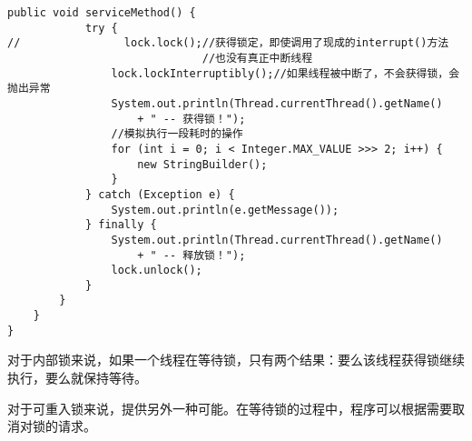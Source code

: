 \documentclass[a4paper]{report}
\begin{document}
\begin{Verbatim}[frame=single,numbersep=5pt,xleftmargin=1.5em,xrightmargin=1.5em]
        public void serviceMethod() {
            try {
//                lock.lock();//获得锁定，即使调用了现成的interrupt()方法
                              //也没有真正中断线程
                lock.lockInterruptibly();//如果线程被中断了，不会获得锁，会抛出异常
                System.out.println(Thread.currentThread().getName() 
                    + " -- 获得锁！");
                //模拟执行一段耗时的操作
                for (int i = 0; i < Integer.MAX_VALUE >>> 2; i++) {
                    new StringBuilder();
                }
            } catch (Exception e) {
                System.out.println(e.getMessage());
            } finally {
                System.out.println(Thread.currentThread().getName() 
                    + " -- 释放锁！");
                lock.unlock();
            }
        }
    }
}
\end{Verbatim}

对于内部锁来说，如果一个线程在等待锁，只有两个结果：要么该线程获得锁继续执行，要么就保持等待。

对于可重入锁来说，提供另外一种可能。在等待锁的过程中，程序可以根据需要取消对锁的请求。
\end{document}
